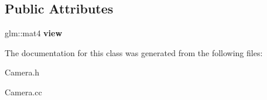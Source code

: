 \subsection*{Public Attributes}
\begin{DoxyCompactItemize}
\item 
\mbox{\label{classCamera_add93fedd6b9a6a6e2c784aeda624de83}} 
glm\+::mat4 {\bfseries view}
\end{DoxyCompactItemize}


The documentation for this class was generated from the following files\+:\begin{DoxyCompactItemize}
\item 
Camera.\+h\item 
Camera.\+cc\end{DoxyCompactItemize}
